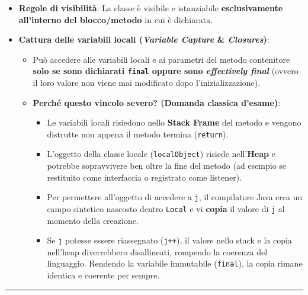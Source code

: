 \documentclass[11pt,a4paper,oneside]{report}
\newcommand{\passthrough}[1]{#1}
\providecommand{\tightlist}{\setlength{\itemsep}{0pt}\setlength{\parskip}{0pt}}
\begin{document}
\begin{itemize}
\tightlist
\item
  \textbf{Regole di visibilità}: La classe è visibile e istanziabile
  \textbf{esclusivamente all'interno del blocco/metodo} in cui è
  dichiarata.
\item
  \textbf{Cattura delle variabili locali (\emph{Variable Capture} \&
  \emph{Closures})}:

  \begin{itemize}
  \tightlist
  \item
    Può accedere alle variabili locali e ai parametri del metodo
    contenitore \textbf{solo se sono dichiarati
    \passthrough{\lstinline!final!} oppure sono \emph{effectively
    final}} (ovvero il loro valore non viene mai modificato dopo
    l'inizializzazione).
  \item
    \textbf{Perché questo vincolo severo? (Domanda classica d'esame)}:

    \begin{itemize}
    \tightlist
    \item
      Le variabili locali risiedono nello \textbf{Stack Frame} del
      metodo e vengono distrutte non appena il metodo termina
      (\passthrough{\lstinline!return!}).
    \item
      L'oggetto della classe locale
      (\passthrough{\lstinline!localObject!}) risiede nell'\textbf{Heap}
      e potrebbe sopravvivere ben oltre la fine del metodo (ad esempio
      se restituito come interfaccia o registrato come listener).
    \item
      Per permettere all'oggetto di accedere a
      \passthrough{\lstinline!j!}, il compilatore Java crea un campo
      sintetico nascosto dentro \passthrough{\lstinline!Local!} e vi
      \textbf{copia} il valore di \passthrough{\lstinline!j!} al momento
      della creazione.
    \item
      Se \passthrough{\lstinline!j!} potesse essere riassegnato
      (\passthrough{\lstinline!j++!}), il valore nello stack e la copia
      nell'heap diverrebbero disallineati, rompendo la coerenza del
      linguaggio. Rendendo la variabile immutabile
      (\passthrough{\lstinline!final!}), la copia rimane identica e
      coerente per sempre.
    \end{itemize}
  \end{itemize}
\end{itemize}

\begin{center}\rule{0.5\linewidth}{0.5pt}\end{center}
\end{document}
